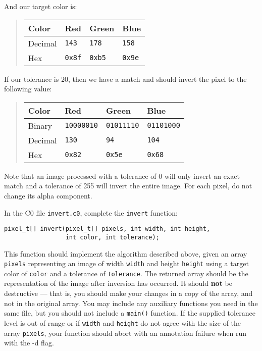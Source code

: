 And our target color is:
\begin{quote}
\renewcommand{\arraystretch}{1.2}
\begin{tabular}{l|lll}
   Color   & Red                   & Green                & Blue
\\\hline
   Decimal & \lstinline'143'       & \lstinline'178'      & \lstinline'158'
\\ Hex     & \lstinline'0x8f'      & \lstinline'0xb5'     & \lstinline'0x9e'
\end{tabular}
\end{quote}
If our tolerance is 20, then we have a match and should invert the pixel to the
following value:
\begin{quote}
\renewcommand{\arraystretch}{1.2}
\begin{tabular}{l|lll}
   Color   & Red                  & Green                & Blue
\\\hline
   Binary  & \lstinline'10000010' & \lstinline'01011110' & \lstinline'01101000'
\\ Decimal & \lstinline'130'      & \lstinline'94'       & \lstinline'104'
\\ Hex     & \lstinline'0x82'     & \lstinline'0x5e'     & \lstinline'0x68'
\end{tabular}
\end{quote}
Note that an image processed with a tolerance of 0 will only invert an exact
match and a tolerance of 255 will invert the entire image.
For each pixel, do not change its alpha component.

\vspace{0.1in}

\begin{task}[4]
In the C0 file \lstinline'invert.c0', complete the \lstinline'invert'
function:
\begin{lstlisting}
pixel_t[] invert(pixel_t[] pixels, int width, int height,
                 int color, int tolerance);
\end{lstlisting}
This function should implement the algorithm described above, given an
array \lstinline'pixels' representing an image of width
\lstinline'width' and height \lstinline'height' using a target color
of \lstinline'color' and a tolerance of \lstinline'tolerance'. The
returned array should be the representation of the image after
inversion has occurred. It should \textbf{not} be destructive --- that
is, you should make your changes in a copy of the array, and not in
the original array.  You may include any auxiliary functions you need
in the same file, but you should not include a \lstinline'main()'
function. If the supplied tolerance level is out of range or if
\lstinline'width' and \lstinline'height' do not agree with the size of
the array \lstinline'pixels', your function should abort with an
annotation failure when run with the -d flag.
\end{task}

